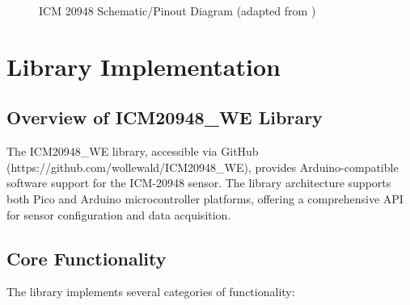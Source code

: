 \begin{figure}
    \centering
    
    
    \caption{ICM 20948 Schematic/Pinout Diagram (adapted from \protect\cite{TDK:2024})}
    \label{fig:ICM20948_Schematic}
\end{figure}


\clearpage







\section{Library Implementation}
\subsection{Overview of ICM20948\_WE Library}
The ICM20948\_WE library, accessible via GitHub (https://github.com/wollewald/ICM20948\_WE), provides Arduino-compatible software support for the ICM-20948 sensor. The library architecture supports both Pico and Arduino microcontroller platforms, offering a comprehensive API for sensor configuration and data acquisition.\cite{TDK:2024}

\subsection{Core Functionality}
The library implements several categories of functionality:

